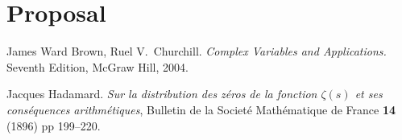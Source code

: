 \documentclass[11pt]{article}
\begin{document}
\bigskip


\bigskip

%

\bigskip 

\section*{Proposal}

\bigskip







\begin{thebibliography}{99}

 James Ward Brown, Ruel V.~Churchill. \textit{Complex Variables and Applications.} Seventh Edition, McGraw Hill, 2004.   

 Jacques Hadamard. \textit{Sur la distribution des z\'{e}ros de la fonction $\zeta(s)$ et ses cons\'{e}quences arithm\'{e}tiques}, Bulletin de la Societ\'{e} Math\'{e}matique de France \textbf{14} (1896) pp 199--220.


\end{thebibliography}






\end{document}

